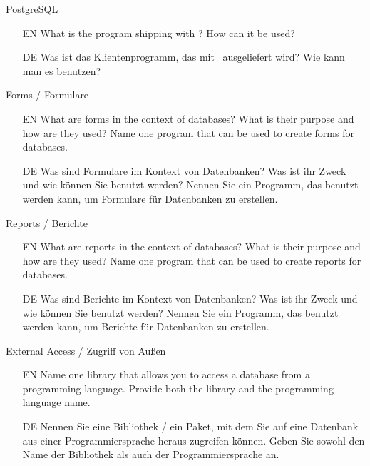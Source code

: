 %
%
\gdef\sqlDialect{\glsShort{SQL}~(\postgresql)}%
%
\begin{question}{PostgreSQL}%
\begin{itemize}%
\item[EN] What is the  program shipping with \postgresql? %
How can it be used?%
\item[DE] Was ist das Klientenprogramm, das mit \postgresql\ ausgeliefert wird? %
Wie kann man es benutzen?%
\end{itemize}%
\end{question}%
%
\begin{question}{Forms / Formulare}%
\begin{itemize}%
\item[EN] What are forms in the context of databases? %
What is their purpose and how are they used? %
Name one program that can be used to create forms for databases.%
\item[DE] Was sind Formulare im Kontext von Datenbanken? %
Was ist ihr Zweck und wie können Sie benutzt werden? %
Nennen Sie ein Programm, das benutzt werden kann, um Formulare für Datenbanken zu erstellen.%
\end{itemize}%
\end{question}%
%
\begin{question}{Reports / Berichte}%
\begin{itemize}%
\item[EN] What are reports in the context of databases? %
What is their purpose and how are they used? %
Name one program that can be used to create reports for databases.%
\item[DE] Was sind Berichte im Kontext von Datenbanken? %
Was ist ihr Zweck und wie können Sie benutzt werden? %
Nennen Sie ein Programm, das benutzt werden kann, um Berichte für Datenbanken zu erstellen.%
\end{itemize}%
\end{question}%
%
\begin{question}{External Access / Zugriff von Außen}%
\begin{itemize}%
\item[EN] Name one library that allows you to access a database from a programming language. %
Provide both the library and the programming language name.%
\item[DE] Nennen Sie eine Bibliothek / ein Paket, mit dem Sie auf eine Datenbank aus einer Programmiersprache heraus zugreifen können. %
Geben Sie sowohl den Name der Bibliothek als auch der Programmiersprache an.%
\end{itemize}%
\end{question}%
%
\endhsection%
